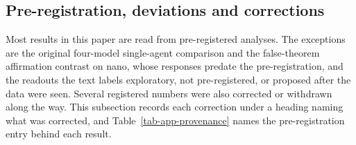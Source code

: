 {\footnotesize

}

\subsection{Pre-registration, deviations and corrections}
\label{app-prereg}

Most results in this paper are read from pre-registered analyses. The
exceptions are the original four-model single-agent comparison and the
false-theorem affirmation contrast on nano, whose responses predate the
pre-registration, and the readouts the text labels exploratory, not
pre-registered, or proposed after the data were seen. Several registered
numbers were also corrected or withdrawn along the way. This subsection
records each correction under a heading naming what was corrected, and
Table~\ref{tab-app-provenance} names the pre-registration entry behind each
result.

